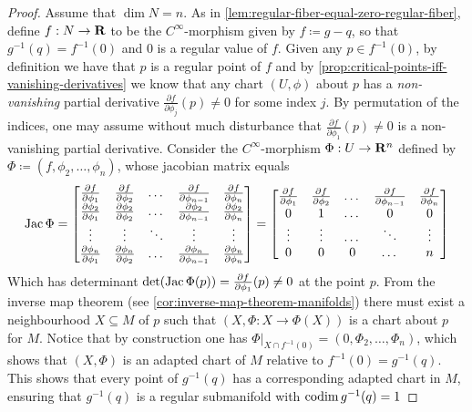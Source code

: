 \begin{proof}
Assume that \(\dim N = n\). As in
\cref{lem:regular-fiber-equal-zero-regular-fiber}, define \(f: N \to \mathbf{R}\) to be
the \(C^{\infty}\)-morphism given by \(f \coloneq g - q\), so that
\(g^{-1}(q) = f^{-1}(0)\) and \(0\) is a regular value of \(f\). Given any
\(p \in f^{-1}(0)\), by definition we have that \(p\) is a regular point of
\(f\) and by \cref{prop:critical-points-iff-vanishing-derivatives} we know that
any chart \((U, \phi)\) about \(p\) has a \emph{non-vanishing} partial
derivative \(\frac{\partial f}{\partial \phi_j}(p) \neq 0\) for some index
\(j\). By permutation of the indices, one may assume without much disturbance
that \(\frac{\partial f}{\partial \phi_1}(p) \neq 0\) is a non-vanishing partial
derivative. Consider the \(C^{\infty}\)-morphism \(\Phi: U \to \mathbf{R}^n\) defined by
\(\Phi \coloneq (f, \phi_2, \dots, \phi_n)\), whose jacobian matrix equals
\[
\operatorname{Jac} \Phi =
\begin{bmatrix}
\frac{\partial f}{\partial \phi_1}
&\frac{\partial f}{\partial \phi_2}
&\dots
&\frac{\partial f}{\partial \phi_{n-1}}
&\frac{\partial f}{\partial \phi_n}
\\
\frac{\partial \phi_2}{\partial \phi_1}
&\frac{\partial \phi_2}{\partial \phi_2}
&\dots
&\frac{\partial \phi_2}{\partial \phi_{n-1}}
&\frac{\partial \phi_2}{\partial \phi_n}
\\
\vdots &\vdots &\ddots &\vdots &\vdots
\\
\frac{\partial \phi_n}{\partial \phi_1}
&\frac{\partial \phi_n}{\partial \phi_2}
&\dots
&\frac{\partial \phi_n}{\partial \phi_{n-1}}
&\frac{\partial \phi_n}{\partial \phi_n}
\end{bmatrix}
=
\begin{bmatrix}
\frac{\partial f}{\partial \phi_1}
&\frac{\partial f}{\partial \phi_2}
&\dots
&\frac{\partial f}{\partial \phi_{n-1}}
&\frac{\partial f}{\partial \phi_n}
\\
0 &1 &\dots &0 &0
\\
\vdots &\vdots &\dots &\ddots &\vdots
\\
0 &0 &0 &\dots &n
\end{bmatrix}
\]
Which has determinant
\(\det(\operatorname{Jac} \Phi(p)) = \frac{\partial f}{\partial \phi_1}(p) \neq 0\) at the
point \(p\). From the inverse map theorem (see
\cref{cor:inverse-map-theorem-manifolds}) there must exist a neighbourhood
\(X \subseteq M\) of \(p\) such that \((X, \Phi: X \to \Phi(X))\) is a chart
about \(p\) for \(M\). Notice that by construction one has
\(\Phi|_{X \cap f^{-1}(0)} = (0, \Phi_2, \dots, \Phi_n)\), which shows that
\((X, \Phi)\) is an adapted chart of \(M\) relative to
\(f^{-1}(0) = g^{-1}(q)\). This shows that every point of \(g^{-1}(q)\) has a
corresponding adapted chart in \(M\), ensuring that \(g^{-1}(q)\) is a regular
submanifold with \(\operatorname{codim} g^{-1}(q) = 1\)
\end{proof}

